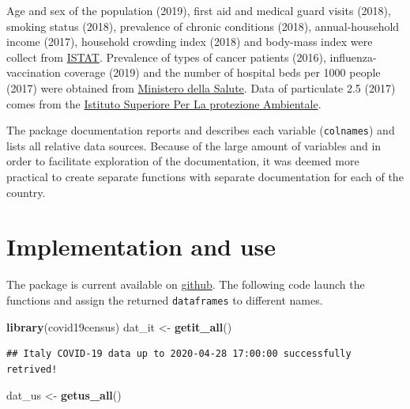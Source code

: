 \documentclass[12pt,halfline,a4paper,]{ouparticle}
\newenvironment{Shaded}{\begin{snugshade}}{\end{snugshade}}
\newcommand{\KeywordTok}[1]{\textcolor[rgb]{0.13,0.29,0.53}{\textbf{#1}}}
\newcommand{\NormalTok}[1]{#1}
\newcommand{\StringTok}[1]{\textcolor[rgb]{0.31,0.60,0.02}{#1}}
\begin{document}
Age and sex of the population (2019), first aid and medical guard visits
(2018), smoking status (2018), prevalence of chronic conditions (2018),
annual-household income (2017), household crowding index (2018) and
body-mass index were collect from
\href{http://dati.istat.it/?lang=en}{ISTAT}. Prevalence of types of
cancer patients (2016), influenza-vaccination coverage (2019) and the
number of hospital beds per 1000 people (2017) were obtained from
\href{http://www.dati.salute.gov.it/}{Ministero della Salute}. Data of
particulate 2.5 (2017) comes from the
\href{https://annuario.isprambiente.it/pon/basic/14}{Istituto Superiore
Per La protezione Ambientale}.

The package documentation reports and describes each variable
(\texttt{colnames}) and lists all relative data sources. Because of the
large amount of variables and in order to facilitate exploration of the
documentation, it was deemed more practical to create separate functions
with separate documentation for each of the country.

\hypertarget{implementation-and-use}{%
\section{Implementation and use}\label{implementation-and-use}}

The package is current available on
\href{https://github.com/c1au6i0/covid19census}{github}. The following
code launch the functions and assign the returned \texttt{dataframes} to
different names.

\bigskip

\begin{Shaded}
\begin{Highlighting}[]
\KeywordTok{library}\NormalTok{(covid19census)}
\NormalTok{dat_it <-}\StringTok{ }\KeywordTok{getit_all}\NormalTok{()}
\end{Highlighting}
\end{Shaded}

\begin{verbatim}
## Italy COVID-19 data up to 2020-04-28 17:00:00 successfully retrived!
\end{verbatim}

\begin{Shaded}
\begin{Highlighting}[]
\NormalTok{dat_us <-}\StringTok{ }\KeywordTok{getus_all}\NormalTok{()}
\end{Highlighting}
\end{Shaded}
\end{document}
